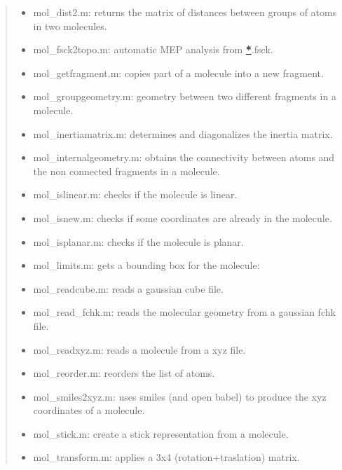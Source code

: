 \documentclass[a4paper]{article}
\begin{document}
\begin{quote}
\begin{itemize}
\item mol\_dist2.m: returns the matrix of distances between groups of atoms
in two molecules.

\item mol\_fsck2topo.m: automatic MEP analysis from %
\hyperlink{id1}{\textbf{\color{red}*}}.fsck.

\item mol\_getfragment.m: copies part of a molecule into a new fragment.

\item mol\_groupgeometry.m: geometry between two different fragments in
a molecule.

\item mol\_inertiamatrix.m: determines and diagonalizes the inertia matrix.

\item mol\_internalgeometry.m: obtains the connectivity between atoms and
the non connected fragments in a molecule.

\item mol\_islinear.m: checks if the molecule is linear.

\item mol\_isnew.m: checks if some coordinates are already in the molecule.

\item mol\_isplanar.m: checks if the molecule is planar.

\item mol\_limits.m: gets a bounding box for the molecule:

\item mol\_readcube.m: reads a gaussian cube file.

\item mol\_read\_fchk.m: reads the molecular geometry from a gaussian fchk file.

\item mol\_readxyz.m: reads a molecule from a xyz file.

\item mol\_reorder.m: reorders the list of atoms.

\item mol\_smiles2xyz.m: uses smiles (and open babel) to produce the xyz
coordinates of a molecule.

\item mol\_stick.m: create a stick representation from a molecule.

\item mol\_transform.m: applies a 3x4 (rotation+traslation) matrix.


\end{itemize}
\end{quote}
\end{document}
